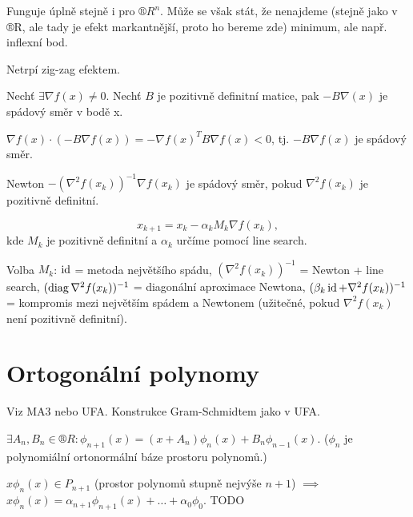 \documentclass[12pt]{article}					%
\begin{document}

	\begin{definice}
		Funguje úplně stejně i pro $®R^n$. Může se však stát, že nenajdeme (stejně jako v ®R, ale tady je efekt markantnější, proto ho bereme zde) minimum, ale např. inflexní bod.

		Netrpí zig-zag efektem.
	\end{definice}

	\begin{lemma}
		Nechť $\exists \nabla f(x) ≠ 0$. Nechť $B$ je pozitivně definitní matice, pak $- B \nabla (x)$ je spádový směr v bodě x.

		\begin{dukazin}
			$\nabla f(x) · (-B \nabla f(x)) = - \nabla f(x)^T B \nabla f(x) < 0$, tj. $-B \nabla f(x)$ je spádový směr.
		\end{dukazin}
	\end{lemma}

	\begin{dusledek}
		Newton $-(\nabla^2 f(x_k))^{-1} \nabla f(x_k)$ je spádový směr, pokud $\nabla^2 f(x_k)$ je pozitivně definitní.
	\end{dusledek}

	\begin{definice}
		$$ x_{k+1} = x_k - \alpha_k M_k \nabla f(x_k), $$
		kde $M_k$ je pozitivně definitní a $\alpha_k$ určíme pomocí line search.

		\begin{poznamkain}
			Volba $M_k$: $\operatorname{id}$ = metoda největšího spádu, $(\nabla^2 f(x_k))^{-1}$ = Newton + line search, $(\operatorname{diag} \nabla^2 f(x_k))^{-1}$ = diagonální aproximace Newtona, $(\beta_k \operatorname{id} + \nabla^2 f(x_k))^{-1}$ = kompromis mezi největším spádem a Newtonem (užitečné, pokud $\nabla^2 f(x_k)$ není pozitivně definitní).
		\end{poznamkain}
	\end{definice}

\section{Ortogonální polynomy}
Viz MA3 nebo UFA. Konstrukce Gram-Schmidtem jako v UFA.

\begin{veta}
	$\exists A_n, B_n \in ®R: \phi_{n+1}(x) = (x + A_n)\phi_n(x) + B_n\phi_{n-1}(x)$. ($\phi_n$ je polynomiální ortonormální báze prostoru polynomů.)

	\begin{dukazin}
		$x \phi_n(x) \in P_{n+1}$ (prostor polynomů stupně nejvýše $n+1$) $\implies$ $x\phi_n(x) = \alpha_{n+1} \phi_{n+1}(x) + … + \alpha_0 \phi_0$. TODO
	\end{dukazin}
\end{veta}
\end{document}
